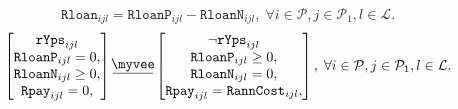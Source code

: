 \documentclass{amsart}
\newcommand{\myveebar}{\mathbin{\vcenter{\hbox{$ \underline{\mkern-2.4mu{\myvee}\mkern-2.4mu} $}}}}
\begin{document}
%
\begin{equation}
    \mathtt{Rloan}_{ijl} = \mathtt{RloanP}_{ijl} - \mathtt{RloanN}_{ijl}
    , \; \forall i\in \mathcal{P}, j\in \mathcal{P}_1, l\in \mathcal{L}.
\end{equation}
%
\begin{equation}
    \begin{bmatrix}
        \mathtt{rYps}_{ijl} \\
        \mathtt{RloanP}_{ijl} = 0, \\
        \mathtt{RloanN}_{ijl} \geq 0,\\
        \mathtt{Rpay}_{ijl} = 0, \\
    \end{bmatrix}
    \myveebar
    \begin{bmatrix}
        \neg \mathtt{rYps}_{ijl} \\
        \mathtt{RloanP}_{ijl} \geq 0, \\
        \mathtt{RloanN}_{ijl} = 0, \\
        \mathtt{Rpay}_{ijl} = \mathtt{RannCost}_{ijl}, \\
    \end{bmatrix}
    , \; \forall i\in \mathcal{P}, j\in \mathcal{P}_1, l\in \mathcal{L}.
\end{equation}
\end{document}
